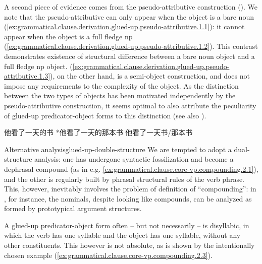 \documentclass[UTF8, a4paper, oneside, scheme=plain, 12pt]{ctexrep}
\begin{document}
A second piece of evidence comes from the pseudo-attributive construction
().
We note that the pseudo-attributive can only appear
when the object is a bare noun 
(\ref{ex:grammatical.clause.derivation.glued-up.pseudo-attributive.1.1}):
it cannot appear when the object is a full fledge \ac{np}
(\ref{ex:grammatical.clause.derivation.glued-up.pseudo-attributive.1.2}).
This contrast demonstrates existence of structural difference
between a bare noun object and a full fledge \ac{np} object.
(\ref{ex:grammatical.clause.derivation.glued-up.pseudo-attributive.1.3}),
on the other hand, is a semi-object construction,
and does not impose any requirements to the complexity of the object.
As the distinction between the two types of objects has been motivated independently by the pseudo-attributive construction,
it seems optimal to also attribute the peculiarity of glued-up predicator-object forms to this distinction
(see also ).

\begin{exe}
    \ex\label{ex:grammatical.clause.derivation.glued-up.pseudo-attributive.1}
    \begin{xlist}
        \ex\label{ex:grammatical.clause.derivation.glued-up.pseudo-attributive.1.1} 他看了一天的书
        \ex\label{ex:grammatical.clause.derivation.glued-up.pseudo-attributive.1.2} *他看了一天的那本书
        \ex\label{ex:grammatical.clause.derivation.glued-up.pseudo-attributive.1.3} 他看了一天书/那本书
    \end{xlist}
\end{exe}

\begin{infobox}{Alternative analysis}{glued-up-double-structure}
    We are tempted to adopt a dual-structure analysis:
    one has undergone syntactic fossilization and become a dephrasal compound
    (as in e.g. \ref{ex:grammatical.clause.core-vp.compounding.2.1}), 
    and the other is regularly built by phrasal structural rules of the verb phrase.
    This, however, inevitably involves the problem of definition of ``compounding'':
    in , for instance,
    the nominals, despite looking like compounds, can be analyzed as
    formed by prototypical argument structures.
\end{infobox}

A glued-up predicator-object form often -- but not necessarily -- is disyllabic,
in which the verb has one syllable and the object has one syllable,
without any other constituents.
This however is not absolute, as is shown by the intentionally chosen example (\ref{ex:grammatical.clause.core-vp.compounding.2.3}).
\end{document}
